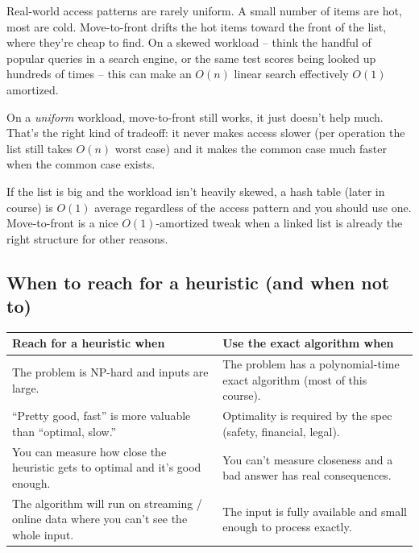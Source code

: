 \documentclass[11pt]{article}
\begin{document}
\begin{ideabox}
Real-world access patterns are rarely uniform. A small number of
items are hot, most are cold. Move-to-front drifts the hot items
toward the front of the list, where they're cheap to find. On a
skewed workload -- think the handful of popular queries in a search
engine, or the same test scores being looked up hundreds of times --
this can make an $O(n)$ linear search effectively $O(1)$ amortized.

On a \emph{uniform} workload, move-to-front still works, it just
doesn't help much. That's the right kind of tradeoff: it never
makes access slower (per operation the list still takes $O(n)$
worst case) and it makes the common case much faster when the
common case exists.
\end{ideabox}

\begin{warnbox}
If the list is big and the workload isn't heavily skewed, a hash
table (\textsection later in course) is $O(1)$ average regardless
of the access pattern and you should use one. Move-to-front is a
nice $O(1)$-amortized tweak when a linked list is already the right
structure for other reasons.
\end{warnbox}

\subsection{When to reach for a heuristic (and when not to)}

\begin{center}
\small
\begin{tabular}{p{5.2cm} p{7cm}}
\textbf{Reach for a heuristic when} & \textbf{Use the exact algorithm when} \\
\hline
The problem is NP-hard and inputs are large. & The problem has a
polynomial-time exact algorithm (most of this course). \\
``Pretty good, fast'' is more valuable than ``optimal, slow.'' &
Optimality is required by the spec (safety, financial, legal). \\
You can measure how close the heuristic gets to optimal and it's
good enough. & You can't measure closeness and a bad answer has
real consequences. \\
The algorithm will run on streaming / online data where you can't
see the whole input. & The input is fully available and small
enough to process exactly. \\
\end{tabular}
\normalsize
\end{center}
\end{document}
